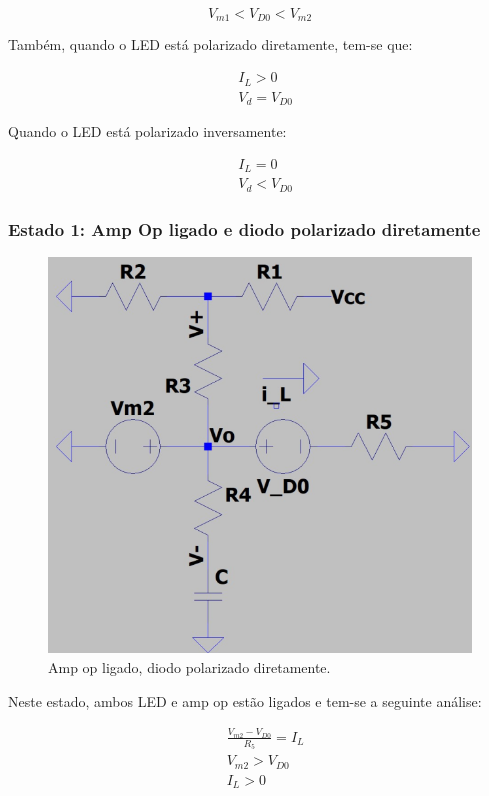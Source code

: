 \begin{equation}
    V_{m1} < V_{D0} < V_{m2}
\end{equation}

Também, quando o LED está polarizado diretamente, tem-se que:

\begin{equation}
    \begin{aligned}
         & I_L > 0      \\
         & V_d = V_{D0}
    \end{aligned}
\end{equation}

Quando o LED está polarizado inversamente:

\begin{equation}
    \begin{aligned}
         & I_L = 0      \\
         & V_d < V_{D0}
    \end{aligned}
\end{equation}

\subsubsection{Estado 1: Amp Op ligado e diodo polarizado diretamente}

\begin{figure}[H]
    \centering
    \includegraphics[width=0.5\columnwidth]{images/ampop1diodo1.png}
    \caption{Amp op ligado, diodo polarizado diretamente.}
\end{figure}

Neste estado, ambos LED e amp op estão ligados e tem-se a seguinte análise:

\begin{equation}
    \begin{aligned}
         & \frac{V_{m2} - V_{D0}}{R_5} = I_L \\
         & V_{m2} > V_{D0}                   \\
         & I_L > 0
    \end{aligned}
\end{equation}

